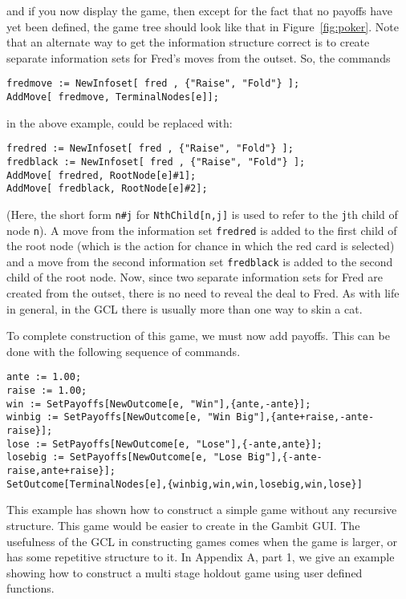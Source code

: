 \noindent
and if you now display the game, then except for the fact that no
payoffs have yet been defined, the game tree should look like that in
Figure~\ref{fig:poker}.  Note that an alternate way to get the
information structure correct is to create separate information sets
for Fred's moves from the outset.  So, the commands 

\begin{verbatim}
fredmove := NewInfoset[ fred , {"Raise", "Fold"} ];
AddMove[ fredmove, TerminalNodes[e]];
\end{verbatim}

\noindent
in the above example, could be replaced with:

\begin{verbatim}
fredred := NewInfoset[ fred , {"Raise", "Fold"} ];
fredblack := NewInfoset[ fred , {"Raise", "Fold"} ];
AddMove[ fredred, RootNode[e]#1];
AddMove[ fredblack, RootNode[e]#2];
\end{verbatim}

\noindent
(Here, the short form \verb+n#j+ for
\verb+NthChild[n,j]+ is used to refer to the
\verb+j+th child of node \verb+n+).  A move from the information set
\verb+fredred+ is added to the first child of the root node (which is
the action for chance in which the red card is selected) and a move
from the second information set \verb+fredblack+ is added to the
second child of the root node.  Now, since two separate information
sets for Fred are created from the outset, there is no need to reveal
the deal to Fred.  As with life in general, in the GCL there is
usually more than one way to skin a cat.

To complete construction of this game, we must now add payoffs. This
can be done with the following sequence of commands. 

\begin{verbatim}
ante := 1.00;
raise := 1.00;
win := SetPayoffs[NewOutcome[e, "Win"],{ante,-ante}];
winbig := SetPayoffs[NewOutcome[e, "Win Big"],{ante+raise,-ante-raise}];
lose := SetPayoffs[NewOutcome[e, "Lose"],{-ante,ante}];
losebig := SetPayoffs[NewOutcome[e, "Lose Big"],{-ante-raise,ante+raise}];
SetOutcome[TerminalNodes[e],{winbig,win,win,losebig,win,lose}]
\end{verbatim}

This example has shown how to construct a simple game without any
recursive structure.  This game would be easier to create in the
Gambit GUI.  The usefulness of the GCL in constructing games comes
when the game is larger, or has some repetitive structure to it.  In
Appendix A, part 1, we give an example showing how to construct a multi stage
holdout game using user defined functions. 

